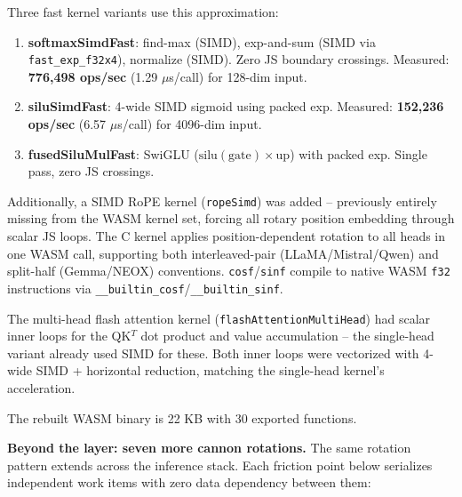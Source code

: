 \documentclass[
  11pt,
]{article}
\begin{document}
Three fast kernel variants use this approximation:

\begin{enumerate}
\def\labelenumi{(\arabic{enumi})}
\item \textbf{softmaxSimdFast}: find-max (SIMD), exp-and-sum (SIMD via \texttt{fast\_exp\_f32x4}), normalize (SIMD).  Zero JS boundary crossings.  Measured: \textbf{776,498 ops/sec} (1.29 \(\mu\)s/call) for 128-dim input.
\item \textbf{siluSimdFast}: 4-wide SIMD sigmoid using packed exp.  Measured: \textbf{152,236 ops/sec} (6.57 \(\mu\)s/call) for 4096-dim input.
\item \textbf{fusedSiluMulFast}: SwiGLU (\(\text{silu}(\text{gate}) \times \text{up}\)) with packed exp.  Single pass, zero JS crossings.
\end{enumerate}

Additionally, a SIMD RoPE kernel (\texttt{ropeSimd}) was added -- previously entirely missing from the WASM kernel set, forcing all rotary position embedding through scalar JS loops.  The C kernel applies position-dependent rotation to all heads in one WASM call, supporting both interleaved-pair (LLaMA/Mistral/Qwen) and split-half (Gemma/NEOX) conventions.  \texttt{cosf}/\texttt{sinf} compile to native WASM \texttt{f32} instructions via \texttt{\_\_builtin\_cosf}/\texttt{\_\_builtin\_sinf}.

The multi-head flash attention kernel (\texttt{flashAttentionMultiHead}) had scalar inner loops for the QK\(^T\) dot product and value accumulation -- the single-head variant already used SIMD for these.  Both inner loops were vectorized with 4-wide SIMD + horizontal reduction, matching the single-head kernel's acceleration.

The rebuilt WASM binary is 22 KB with 30 exported functions.

\textbf{Beyond the layer: seven more cannon rotations.}  The same rotation pattern extends across the inference stack.  Each friction point below serializes independent work items with zero data dependency between them:
\end{document}
